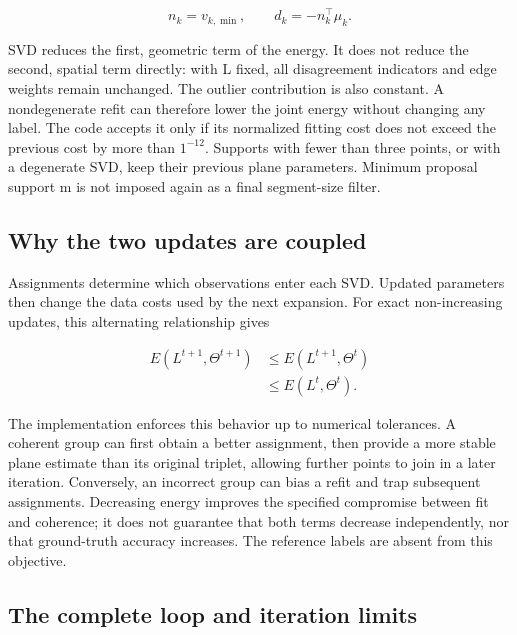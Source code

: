 \begin{equation}
n_k=v_{k,\min},\qquad d_k=-n_k^\top\mu_k.
\label{eq:36}
\end{equation}

SVD reduces the first, geometric term of the energy. It does not reduce the second, spatial term directly: with L fixed, all disagreement indicators and edge weights remain unchanged. The outlier contribution is also constant. A nondegenerate refit can therefore lower the joint energy without changing any label. The code accepts it only if its normalized fitting cost does not exceed the previous cost by more than \(1^{-12}\). Supports with fewer than three points, or with a degenerate SVD, keep their previous plane parameters. Minimum proposal support m is not imposed again as a final segment-size filter.

\subsection{Why the two updates are coupled}\label{why-the-two-updates-are-coupled}

Assignments determine which observations enter each SVD. Updated parameters then change the data costs used by the next expansion. For exact non-increasing updates, this alternating relationship gives

\begin{equation}
\begin{aligned}E(L^{t+1},\Theta^{t+1})&\leq E(L^{t+1},\Theta^t)\\&\leq E(L^t,\Theta^t).\end{aligned}
\label{eq:37}
\end{equation}

The implementation enforces this behavior up to numerical tolerances. A coherent group can first obtain a better assignment, then provide a more stable plane estimate than its original triplet, allowing further points to join in a later iteration. Conversely, an incorrect group can bias a refit and trap subsequent assignments. Decreasing energy improves the specified compromise between fit and coherence; it does not guarantee that both terms decrease independently, nor that ground-truth accuracy increases. The reference labels are absent from this objective.

\subsection{The complete loop and iteration limits}\label{the-complete-loop-and-iteration-limits}

